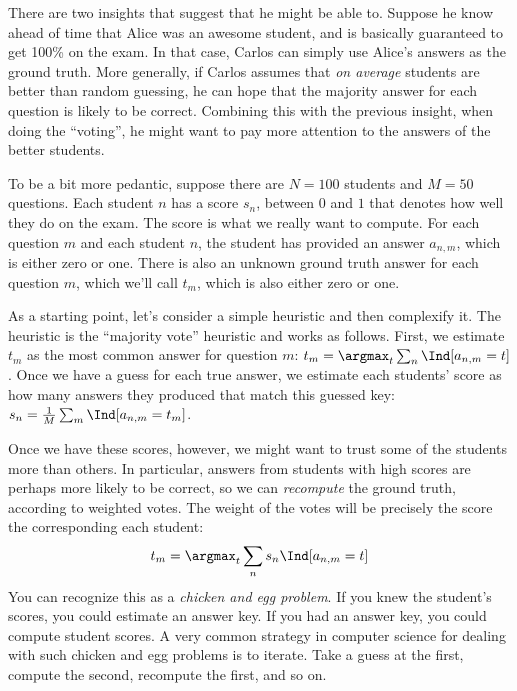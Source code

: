 There are two insights that suggest that he might be able to.
Suppose he know ahead of time that Alice was an awesome student, and is basically guaranteed to get 100\% on the exam.
In that case, Carlos can simply use Alice's answers as the ground truth.
More generally, if Carlos assumes that \emph{on average} students are better than random guessing, he can hope that the majority answer for each question is likely to be correct.
Combining this with the previous insight, when doing the ``voting'', he might want to pay more attention to the answers of the better students.

To be a bit more pedantic, suppose there are $N=100$ students and $M=50$ questions.
Each student $n$ has a score $s_n$, between $0$ and $1$ that denotes how well they do on the exam.
The score is what we really want to compute.
For each question $m$ and each student $n$, the student has provided an answer $a_{n,m}$, which is either zero or one.
There is also an unknown ground truth answer for each question $m$, which we'll call $t_m$, which is also either zero or one.

As a starting point, let's consider a simple heuristic and then complexify it.
The heuristic is the ``majority vote'' heuristic and works as follows.
First, we estimate $t_m$ as the most common answer for question $m$:
$t_m = \argmax_t \sum_n \Ind[a_{n,m} = t]$.
Once we have a guess for each true answer, we estimate each students' score as how many answers they produced that match this guessed key:
$s_n = \frac 1 M \sum_m \Ind[a_{n,m} = t_m]$.

Once we have these scores, however, we might want to trust some of the students more than others.
In particular, answers from students with high scores are perhaps more likely to be correct, so we can \emph{recompute} the ground truth, according to weighted votes.
The weight of the votes will be precisely the score the corresponding each student:
%
\begin{align}
  t_m = \argmax_t \sum_n s_n \Ind[a_{n,m} = t]
\end{align}
%
You can recognize this as a \emph{chicken and egg problem}. If you knew the student's scores, you could estimate an answer key. If you had an answer key, you could compute student scores.
A very common strategy in computer science for dealing with such chicken and egg problems is to iterate.
Take a guess at the first, compute the second, recompute the first, and so on.

